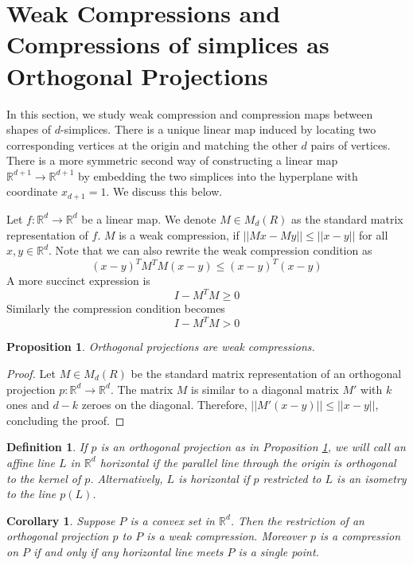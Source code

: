 \documentclass[a4paper, 12pt]{amsart}
\theoremstyle{plain}
\newtheorem{Coro}[Thm]{Corollary}
\newtheorem{Prop}[Thm]{Proposition}
\newtheorem{Def}[Thm]{Definition}
\begin{document}
\section{Weak Compressions and Compressions  of simplices as Orthogonal Projections}

In this section, we  study weak compression and compression maps between shapes of $d$-simplices. There is a unique linear map induced by locating two corresponding vertices at the origin and matching the other $d$ pairs of vertices. There is a more symmetric second way of constructing a linear map $\mathbb{R}^{d+1}\to\mathbb{R}^{d+1}$ by embedding the two simplices into the hyperplane with coordinate $x_{d+1}=1$. We discuss this below. 

Let $f:\mathbb{R}^d\to \mathbb{R}^d$ be a linear map. We denote $M\in M_d(R)$ as the standard matrix representation of $f$. $M$ is a weak compression, if $||Mx-My||\leq ||x-y||$ for all $x,y\in \mathbb{R}^d$. Note that we can also rewrite the weak compression condition as $$(x-y)^TM^TM(x-y) \le (x-y)^T(x-y)$$
A more succinct expression is $$I-M^TM \ge 0$$
Similarly the compression condition becomes $$I-M^TM > 0$$

\begin{Prop} \label{Proj} 
Orthogonal projections are weak compressions.
\end{Prop}
\begin{proof}  Let $M\in M_d(R)$ be the standard matrix representation of an orthogonal projection $p: \mathbb{R}^d \to \mathbb{R}^{d}$. The matrix $M$ is similar to a diagonal matrix $M'$ with $k$ ones and $d-k$ zeroes on the diagonal. Therefore, $||M'(x-y)|| \leq ||x-y||$, concluding the proof. 
\end{proof}

\begin{Def}
If $p$ is an orthogonal projection as in Proposition \ref{Proj}, we will call an affine line $L$ in $\mathbb{R}^d$ horizontal if the parallel line through the origin is orthogonal to the kernel of $p$. Alternatively, $L$ is horizontal if $p$ restricted to $L$ is an isometry to the line $p(L)$.

\end{Def}

\begin{Coro} \label{Proj1}
Suppose $P$ is a convex set in $\mathbb{R}^d$. Then the restriction of an orthogonal projection $p$ to $P$ is a weak compression. Moreover $p$ is a compression on $P$ if and only if any horizontal line meets $P$ is a single point. 

\end{Coro}
\end{document}

